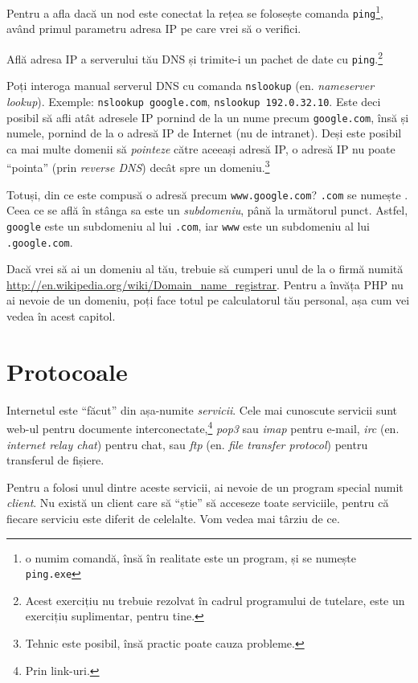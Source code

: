 Pentru a afla dacă un nod este conectat la rețea se folosește comanda
\texttt{ping}\footnote{o numim comandă, însă în realitate este un program,
și se numește \texttt{ping.exe}}, având primul
parametru adresa IP pe care vrei să o verifici.

\begin{Exercise}[title={Ping your DNS server}]
Află adresa IP a serverului tău DNS și trimite-i un pachet de date cu \texttt{ping}.\footnote{Acest exercițiu nu trebuie
rezolvat în cadrul programului de tutelare, este un exercițiu suplimentar,
pentru tine.}
\end{Exercise}

Poți interoga manual serverul DNS cu comanda \texttt{nslookup}
(en. \textsl{nameserver lookup}). Exemple:
\texttt{nslookup google.com}, \texttt{nslookup 192.0.32.10}.
Este deci posibil să afli atât adresele IP pornind de la un nume precum
\texttt{google.com}, însă și numele, pornind de la o adresă IP de Internet
(nu de intranet).
Deși este posibil ca mai multe domenii să \textsl{pointeze} către aceeași
adresă IP, o adresă IP nu poate ``pointa'' (prin \textsl{reverse DNS})
decât spre un domeniu.\footnote{Tehnic este posibil, însă practic poate
cauza probleme.}

Totuși, din ce este compusă o adresă precum \texttt{www.google.com}?
\texttt{.com} se numește . Ceea ce se află în stânga
sa este un \textsl{subdomeniu}, până la următorul punct.
Astfel, \texttt{google} este un subdomeniu al lui \texttt{.com},
iar \texttt{www} este un subdomeniu al lui \texttt{.google.com}.

Dacă vrei să ai un domeniu al tău, trebuie să cumperi unul de la
o firmă numită \url{http://en.wikipedia.org/wiki/Domain_name_registrar}. Pentru a învăța PHP nu ai nevoie de un domeniu, poți
face totul pe calculatorul tău personal, așa cum vei vedea în acest capitol.

\section{Protocoale}
Internetul este ``făcut'' din așa-numite \textsl{servicii}. Cele mai cunoscute servicii sunt
web-ul pentru documente interconectate,\footnote{Prin link-uri.}
\textsl{pop3} sau \textsl{imap} pentru e-mail,
\textsl{irc} (en. \textsl{internet relay chat}) pentru chat, sau
\textsl{ftp} (en. \textsl{file transfer protocol}) pentru transferul de fișiere.

Pentru a folosi unul dintre aceste servicii, ai nevoie de un program
special numit \textsl{client}. Nu există un client care să ``știe'' 
să acceseze toate serviciile, pentru
că fiecare serviciu este diferit de celelalte. Vom vedea mai târziu de ce.

